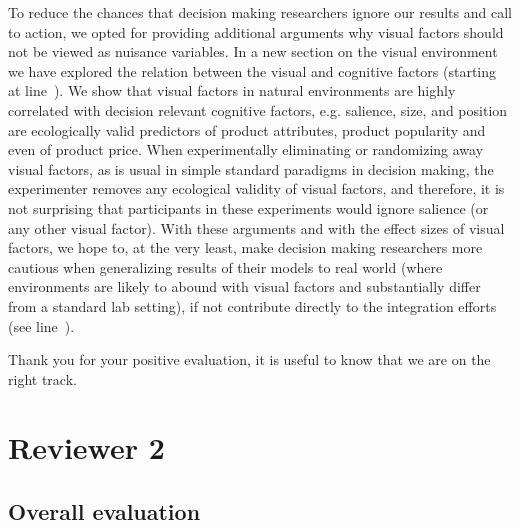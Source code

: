 To reduce the chances that decision making researchers ignore our results and call to action, we opted for providing additional arguments why visual factors should not be viewed as nuisance variables. In a new section on the visual environment we have explored the relation between the visual and cognitive factors (starting at line~). We show that visual factors in natural environments are highly correlated with decision relevant cognitive factors, e.g. salience, size, and position are ecologically valid predictors of product attributes, product popularity and even of product price. When experimentally eliminating or randomizing away visual factors, as is usual in simple standard paradigms in decision making, the experimenter removes any ecological validity of visual factors, and therefore, it is not surprising that participants in these experiments would ignore salience (or any other visual factor). With these arguments and with the effect sizes of visual factors, we hope to, at the very least, make decision making researchers more cautious when generalizing results of their models to real world (where environments are likely to abound with visual factors and substantially differ from a standard lab setting), if not contribute directly to the integration efforts (see  line~).



Thank you for your positive evaluation, it is useful to know that we are on the right track.




\section{Reviewer 2}
\label{rev:r2}

\subsection{Overall evaluation}
\label{rev:r2sum}

